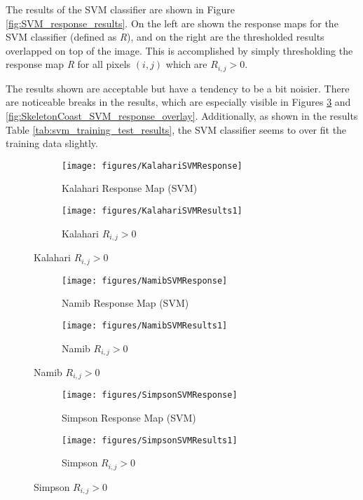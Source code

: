 The results of the SVM classifier are shown in Figure \ref{fig:SVM_response_results}. On the left are shown the response maps for the SVM classifier (defined as \emph{R}), and on the right are the thresholded results overlapped on top of the image. This is accomplished by simply thresholding the response map \emph{R} for all pixels $(i,j)$ which are $R_{i,j} > 0$. 

The results shown are acceptable but have a tendency to be a bit noisier. There are noticeable breaks in the results, which are especially visible in Figures \ref{fig:kalahari_SVM_response_overlay} and \ref{fig:SkeletonCoast_SVM_response_overlay}. Additionally, as shown in the results Table \ref{tab:svm_training_test_results}, the SVM classifier seems to over fit the training data slightly. 
\begin{figure}[H]
	\centering
	\begin{subfigure}{0.48\textwidth}
		\centering
		\texttt{[image: figures/KalahariSVMResponse]}
		\caption{Kalahari Response Map (SVM)}
		\label{fig:kalahari_SVM_response}
	\end{subfigure}
	\begin{subfigure}{0.48\textwidth}
		\centering
		\texttt{[image: figures/KalahariSVMResults1]}
		\caption{ Kalahari $R_{i,j} > 0$}
		\label{fig:kalahari_SVM_response_overlay}
	\end{subfigure}
\end{figure}
\begin{figure}[H]
	\ContinuedFloat
	\centering
	\begin{subfigure}{0.48\textwidth}
		\centering
		\texttt{[image: figures/NamibSVMResponse]}
		\caption{Namib Response Map (SVM)}
		\label{fig:namib_SVM_response}
	\end{subfigure}
	\begin{subfigure}{0.48\textwidth}
		\centering
		\texttt{[image: figures/NamibSVMResults1]}
		\caption{ Namib $R_{i,j} > 0$}
		\label{fig:namib_SVM_response_overlay}
	\end{subfigure}
\end{figure}
\begin{figure}[H]
	\ContinuedFloat
	\centering
	\begin{subfigure}{0.48\textwidth}
		\centering
		\texttt{[image: figures/SimpsonSVMResponse]}
		\caption{Simpson Response Map (SVM)}
		\label{fig:simpson_SVM_response}
	\end{subfigure}
	\begin{subfigure}{0.48\textwidth}
		\centering
		\texttt{[image: figures/SimpsonSVMResults1]}
		\caption{ Simpson $R_{i,j} > 0$}
		\label{fig:simpson_SVM_response_overlay}
	\end{subfigure}
\end{figure}
